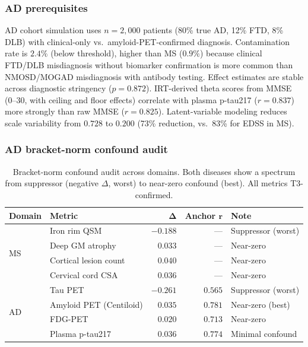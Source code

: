 \documentclass{article}
\begin{document}
\subsubsection{AD prerequisites}

AD cohort simulation uses $n = 2{,}000$ patients (80\% true AD, 12\% FTD, 8\% DLB) with clinical-only vs.\ amyloid-PET-confirmed diagnosis.
Contamination rate is $2.4\%$ (below threshold), higher than MS ($0.9\%$) because clinical FTD/DLB misdiagnosis without biomarker confirmation is more common than NMOSD/MOGAD misdiagnosis with antibody testing.
Effect estimates are stable across diagnostic stringency ($p = 0.872$).
IRT-derived theta scores from MMSE (0--30, with ceiling and floor effects) correlate with plasma p-tau217 ($r = 0.837$) more strongly than raw MMSE ($r = 0.825$).
Latent-variable modeling reduces scale variability from $0.728$ to $0.200$ (73\% reduction, vs.\ 83\% for EDSS in MS).

\subsubsection{AD bracket-norm confound audit}

\begin{table}[t]
\centering
\caption{Bracket-norm confound audit across domains. Both diseases show a spectrum from suppressor (negative $\Delta$, worst) to near-zero confound (best). All metrics T3-confirmed.}
\label{tab:p1-cross}
\small
\begin{tabular}{@{}llrrl@{}}
\toprule
\textbf{Domain} & \textbf{Metric} & $\boldsymbol{\Delta}$ & \textbf{Anchor} $\boldsymbol{r}$ & \textbf{Note} \\
\midrule
\multirow{4}{*}{MS}
& Iron rim QSM & $-0.188$ & --- & Suppressor (worst) \\
& Deep GM atrophy & $0.033$ & --- & Near-zero \\
& Cortical lesion count & $0.040$ & --- & Near-zero \\
& Cervical cord CSA & $0.036$ & --- & Near-zero \\
\midrule
\multirow{4}{*}{AD}
& Tau PET & $-0.261$ & $0.565$ & Suppressor (worst) \\
& Amyloid PET (Centiloid) & $0.035$ & $0.781$ & Near-zero (best) \\
& FDG-PET & $0.020$ & $0.713$ & Near-zero \\
& Plasma p-tau217 & $0.036$ & $0.774$ & Minimal confound \\
\bottomrule
\end{tabular}
\end{table}
\end{document}
